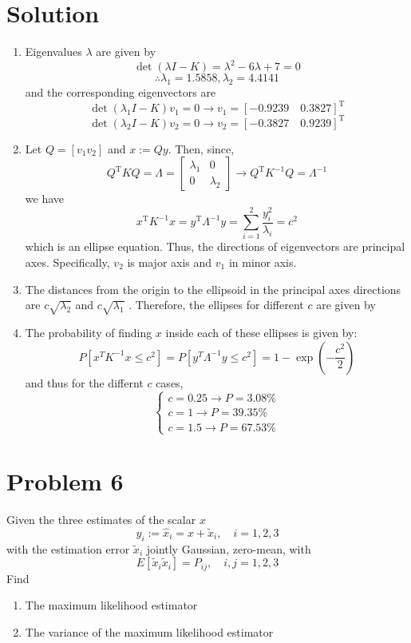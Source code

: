 \documentclass[10pt,a4paper,oneside]{article}
\begin{document}
\section*{Solution}
\begin{enumerate}
\item Eigenvalues $\lambda$ are given by
\[
\operatorname{det}(\lambda I-K)=\lambda^{2}-6 \lambda+7=0
\]
\[
\therefore \lambda_{1}=1.5858, \lambda_{2}=4.4141
\]
and the corresponding eigenvectors are
\[
\operatorname{det}\left(\lambda_{1} I-K\right) v_{1}=0 \rightarrow v_{1}=[-0.9239 \quad 0.3827]^{\mathrm{T}}
\]
\[
\operatorname{det}\left(\lambda_{2} I-K\right) v_{2}=0 \rightarrow v_{2}=[-0.3827 \quad 0.9239]^{\mathrm{T}}
\]
\item Let $Q=\left[v_{1} v_{2}\right]$ and $x :=Q y .$ Then, since,
\[
Q^{\mathrm{T}} K Q=\Lambda=\left[\begin{array}{cc}{\lambda_{1}} & {0} \\ {0} & {\lambda_{2}}\end{array}\right] \rightarrow Q^{\mathrm{T}} K^{-1} Q=\Lambda^{-1}
\]
we have
\[
x^{\mathrm{T}} K^{-1} x=y^{\mathrm{T}} \Lambda^{-1} y=\sum_{i=1}^{2} \frac{y_{i}^{2}}{\lambda_{i}}=c^{2}
\]
which is an ellipse equation. Thus, the directions of eigenvectors are principal axes. Specifically,
$v_{2}$ is major axis and $v_{1}$ in minor axis.
\item The distances from the origin to the ellipsoid in the principal axes directions are $c \sqrt{\lambda_{2}}$ and $c \sqrt{\lambda_{1}}$ . Therefore, the ellipses for different $c$ are given by
\item The probability of finding $x$ inside each of these ellipses is given by:
\[
P\left[x^{T} K^{-1} x \leq c^{2}\right]=P\left[y^{T} \Lambda^{-1} y \leq c^{2}\right]=1-\exp \left(-\frac{c^{2}}{2}\right)
\]
and thus for the differnt $c$ cases,
\[
\left\{\begin{array}{l}{c=0.25 \rightarrow P=3.08 \%} \\ {c=1 \rightarrow P=39.35 \%} \\ {c=1.5 \rightarrow P=67.53 \%}\end{array}\right.
\]
\end{enumerate}
\section* {Problem 6} 
Given the three estimates of the scalar $x$
\[
y_{i} :=\hat{x}_{i}=x+\tilde{x}_{i}, \quad i=1,2,3
\]
with the estimation error $\tilde{x}_{i}$ jointly Gaussian, zero-mean, with
\[
E\left[\tilde{x}_{i} \tilde{x}_{i}\right]=P_{i j}, \quad i, j=1,2,3
\]
Find
\begin{enumerate}
\item The maximum likelihood estimator
\item The variance of the maximum likelihood estimator
\end{enumerate}
\end{document}
